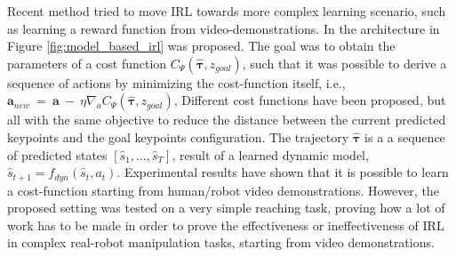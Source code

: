 Recent method \cite{das2021model_based_irl_from_vd} tried to move IRL towards more complex learning scenario, such as learning a reward function from video-demonstrations. In \cite{das2021model_based_irl_from_vd} the architecture in Figure \ref{fig:model_based_irl} was proposed. The goal was to obtain the parameters of a cost function $C_{\Psi}(\hat{\boldsymbol{\tau}}, z_{goal})$, such that it was possible to derive a sequence of actions by minimizing the cost-function itself, i.e., $\textbf{a}_{new} \ = \ \textbf{a} \ - \ \eta \nabla_{a} C_{\Psi}(\hat{\boldsymbol{\tau}}, z_{goal})$, Different cost functions have been proposed, but all with the same objective to reduce the distance between the current predicted keypoints and the goal keypoints configuration. The trajectory $\hat{\boldsymbol{\tau}}$ is a a sequence of predicted states $[\hat{s}_{1}, \dots, \hat{s}_{T}]$, result of a learned dynamic model, $\hat{s}_{t+1} = f_{dyn}(\hat{s}_{t}, a_{t})$. Experimental results have shown that it is possible to learn a cost-function starting from human/robot video demonstrations. However, the proposed setting was tested on a very simple reaching task, proving how a lot of work has to be made in order to prove the effectiveness or ineffectiveness of IRL in complex real-robot manipulation tasks, starting from video demonstrations.
